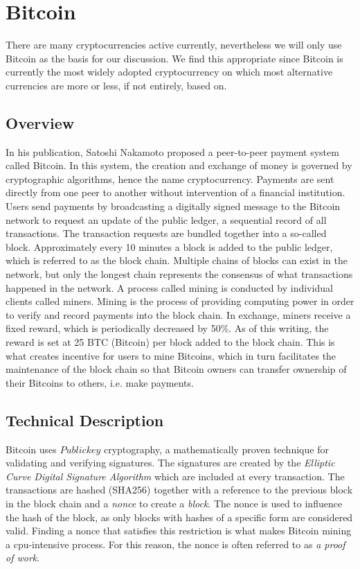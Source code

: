 \documentclass[12pt,journal,compsoc]{IEEEtran}
\begin{document}
\section{Bitcoin}
There are many cryptocurrencies active currently, nevertheless we will only use Bitcoin as the basis for our discussion. We find this appropriate since Bitcoin is currently the most widely adopted cryptocurrency on which most alternative currencies are more or less, if not entirely, based on.

\subsection{Overview}
In his publication\cite{nakamoto2008bitcoin}, Satoshi Nakamoto proposed a peer-to-peer payment system  called Bitcoin. In this system, the creation and exchange of money is governed by cryptographic algorithms, hence the name cryptocurrency. Payments are sent directly from one peer to another without intervention of a financial institution.
Users send payments by broadcasting a digitally signed message to the Bitcoin network to request an update of the public ledger, a sequential record of all transactions. The transaction requests are bundled together into a so-called block. Approximately every 10 minutes a block is added to the public ledger, which is referred to as the block chain.
Multiple chains of blocks can exist in the network, but only the longest chain represents the
consensus of what transactions happened in the network.
A process called mining is conducted by individual clients called miners. Mining is the process of providing computing power in order to verify and record payments into the block chain. In exchange, miners receive a fixed reward, which is periodically decreased by 50\%. As of this writing, the reward is set at 25 BTC (Bitcoin) per block added to the block chain. This is what creates incentive for users to mine Bitcoins, which in turn facilitates the maintenance of the block chain so that Bitcoin owners can transfer ownership of their Bitcoins to others, i.e. make payments.

\subsection{Technical Description}
Bitcoin uses $Public key$ cryptography, a mathematically proven technique for validating and
verifying signatures. The signatures are created by the {\it Elliptic Curve Digital Signature
Algorithm} which are included at every transaction.
The transactions are hashed (SHA256) together with a reference to the previous block in the
block chain and a \emph{nonce} to create a \emph{block}.
The nonce is used to influence the hash of the block, as only blocks with hashes of a specific form
are considered valid.
Finding a nonce that satisfies this restriction is what makes Bitcoin mining a cpu-intensive
process.
For this reason, the nonce is often referred to as \emph{a proof of work}.
\end{document}
